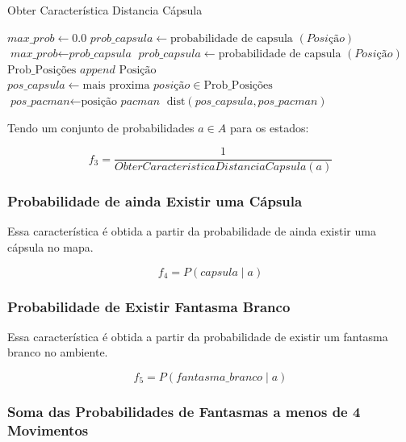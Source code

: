 \begin{algorithm}[H]
	\caption{Obter Característica Distancia Cápsula} \label{algorithm:ObterCaracteristicaDistanciaCapsula}
	\begin{algorithmic}[1]
			\State $\textit{max\_prob} \gets 0.0 $
				\State $\textit{prob\_capsula} \gets \text{probabilidade de capsula } \left( \textit{Posição} \right) $
					\State $\textit{max\_prob} \gets \textit{prob\_capsula} $
				\EndIf 
			\EndFor
				\State $\textit{prob\_capsula} \gets \text{probabilidade de capsula } \left( \textit{Posição} \right) $
					\State $ \text{Prob\_Posições } append \text{ Posição} $
				\EndIf 
			\EndFor
			\State $\textit{pos\_capsula} \gets \text{mais proxima }\textit{posição} \in \text{Prob\_Posições} $
			\State $\textit{pos\_pacman} \gets \text{posição }\textit{pacman} $
			\State \Return $ \text{dist} \left( \textit{pos\_capsula}, \textit{pos\_pacman} \right) $
		\EndProcedure
	\end{algorithmic}
\end{algorithm}

Tendo um conjunto de probabilidades $ a \in A $ para os estados:

$$ f_3 = \frac{1}{ObterCaracteristicaDistanciaCapsula \left( a \right)} $$

\subsubsection*{Probabilidade de ainda Existir uma Cápsula}

Essa característica é obtida a partir da probabilidade de ainda existir uma cápsula no mapa.

$$ f_4 = P \left( capsula \mid a \right) $$

\subsubsection*{Probabilidade de Existir Fantasma Branco}

Essa característica é obtida a partir da probabilidade de existir um fantasma branco no ambiente.

$$ f_5 = P \left( fantasma\_branco \mid a \right) $$

\subsubsection*{Soma das Probabilidades de Fantasmas a menos de 4 Movimentos}

